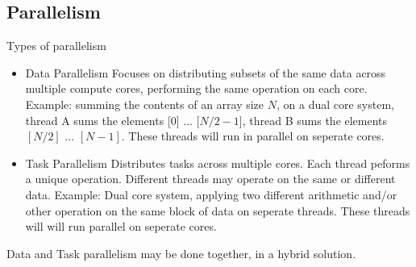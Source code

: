 \documentclass[oneside]{book}
\begin{document}
            \subsection{Parallelism}
                Types of parallelism
                \begin{itemize}
                    \item Data Parallelism
                        \subitem Focuses on distributing subsets of the same data across multiple compute cores, performing the same operation on each core.
                        \subitem Example: summing the contents of an array size $N$, on a dual core system, thread A sums the elements [0] ... [$N/2 - 1$], thread B
                        sums the elements $[N/2]$ ... $[N-1]$. These threads will run in parallel on seperate cores.
                    \item Task Parallelism
                        \subitem Distributes tasks across multiple cores. Each thread peforms a unique operation. Different threads may operate on the same or different
                        data.
                        \subitem Example: Dual core system, applying two different arithmetic and/or other operation on the same block of data on seperate threads. These
                        threads will will run parallel on seperate cores.
                \end{itemize}
                Data and Task parallelism may be done together, in a hybrid solution.
                \begin{figure}[H]
                    \centering
                \end{figure}
\end{document}

